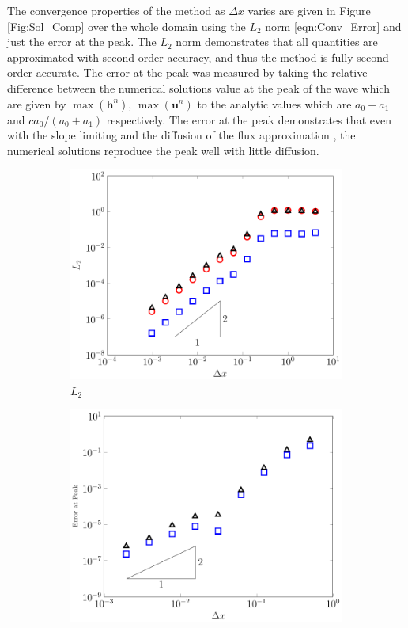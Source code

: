 \documentclass[10pt]{elsarticle}
\newcommand{\vecn}[1]{\boldsymbol{#1}}
\begin{document}
The convergence properties of the method as $\Delta x$ varies are given in Figure \ref{Fig:Sol_Comp} over the whole domain using the $L_2$ norm \eqref{eqn:Conv_Error} and just the error at the peak. The $L_2$ norm demonstrates that all quantities are approximated with second-order accuracy, and thus the method is fully second-order accurate. The error at the peak was measured by taking the relative difference between the numerical solutions value at the peak of the wave which are given by $\max\left({\vecn{h}^n}\right)$, $\max\left({\vecn{u}^n}\right)$ to the analytic values which are $a_0 + a_1$ and $c a_0 / \left(a_0 + a_1\right)$ respectively. The error at the peak demonstrates that even with the slope limiting and the diffusion of the flux approximation \cite{Pitt-2018-61}, the numerical solutions reproduce the peak well with little diffusion. 
%
\begin{figure}
	\centering
	\begin{subfigure}{0.49\textwidth}
		\centering
		\includegraphics[width=\textwidth]{./Figures/Simulations/Validation/Serre/NormResults.pdf}
		\caption{$L_2$}
		\label{Fig:Sol_Comp_Conv}
	\end{subfigure}
	\begin{subfigure}{0.49\textwidth}
		\centering
		\includegraphics[width=\textwidth]{./Figures/Simulations/Validation/Serre/PeakError.pdf}

\end{subfigure}
\end{figure}
\end{document}
